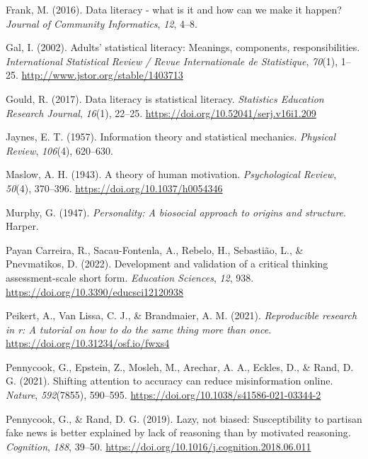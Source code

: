 \documentclass[
  12pt,
  a4paper,
  twoside]{article}
\newlength{\cslhangindent}
\newenvironment{CSLReferences}[2] %
 {\begin{list}{}{%
  \setlength{\itemindent}{0pt}
  \setlength{\leftmargin}{0pt}
  \setlength{\parsep}{0pt}
  \ifodd #1
   \setlength{\leftmargin}{\cslhangindent}
   \setlength{\itemindent}{-1\cslhangindent}
  \fi
  \setlength{\itemsep}{#2\baselineskip}}}
 {\end{list}}
\begin{document}
\begin{CSLReferences}{1}{0}
Frank, M. (2016). Data literacy - what is it and how can we make it happen? \emph{Journal of Community Informatics}, \emph{12}, 4--8.

Gal, I. (2002). Adults' statistical literacy: Meanings, components, responsibilities. \emph{International Statistical Review / Revue Internationale de Statistique}, \emph{70}(1), 1--25. \url{http://www.jstor.org/stable/1403713}

Gould, R. (2017). Data literacy is statistical literacy. \emph{Statistics Education Research Journal}, \emph{16}(1), 22--25. \url{https://doi.org/10.52041/serj.v16i1.209}

Jaynes, E. T. (1957). Information theory and statistical mechanics. \emph{Physical Review}, \emph{106}(4), 620--630.

Maslow, A. H. (1943). A theory of human motivation. \emph{Psychological Review}, \emph{50}(4), 370--396. \url{https://doi.org/10.1037/h0054346}

Murphy, G. (1947). \emph{Personality: A biosocial approach to origins and structure}. Harper.

Payan Carreira, R., Sacau-Fontenla, A., Rebelo, H., Sebastião, L., \& Pnevmatikos, D. (2022). Development and validation of a critical thinking assessment-scale short form. \emph{Education Sciences}, \emph{12}, 938. \url{https://doi.org/10.3390/educsci12120938}

Peikert, A., Van Lissa, C. J., \& Brandmaier, A. M. (2021). \emph{Reproducible research in r: A tutorial on how to do the same thing more than once}. \url{https://doi.org/10.31234/osf.io/fwxs4}

Pennycook, G., Epstein, Z., Mosleh, M., Arechar, A. A., Eckles, D., \& Rand, D. G. (2021). Shifting attention to accuracy can reduce misinformation online. \emph{Nature}, \emph{592}(7855), 590--595. \url{https://doi.org/10.1038/s41586-021-03344-2}

Pennycook, G., \& Rand, D. G. (2019). Lazy, not biased: Susceptibility to partisan fake news is better explained by lack of reasoning than by motivated reasoning. \emph{Cognition}, \emph{188}, 39--50. \url{https://doi.org/10.1016/j.cognition.2018.06.011}


\end{CSLReferences}
\end{document}
